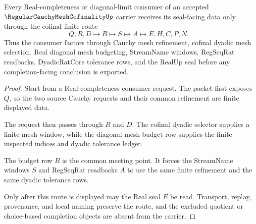 \begin{theorem}
\label{thm:regular-cauchy-mesh-cofinality-real-completeness-handoff}
Every Real-completeness or diagonal-limit consumer of an accepted $\RegularCauchyMeshCofinalityUp$ carrier receives its seal-facing data only through the cofinal finite route
$$
Q,R,D \longmapsto B \longmapsto S \longmapsto A \longmapsto E,H,C,P,N .
$$
Thus the consumer factors through Cauchy mesh refinement, cofinal dyadic mesh selection, Real diagonal mesh budgeting, StreamName windows, RegSeqRat readbacks, DyadicRatCore tolerance rows, and the RealUp seal before any completion-facing conclusion is exported.
\end{theorem}
\begin{proof}
Start from a Real-completeness consumer request. The packet first exposes $Q$, so the two source Cauchy requests and their common refinement are finite displayed data.

The request then passes through $R$ and $D$. The cofinal dyadic selector supplies a finite mesh window, while the diagonal mesh-budget row supplies the finite inspected indices and dyadic tolerance ledger.

The budget row $B$ is the common meeting point. It forces the StreamName windows $S$ and RegSeqRat readbacks $A$ to use the same finite refinement and the same dyadic tolerance rows.

Only after this route is displayed may the Real seal $E$ be read. Transport, replay, provenance, and local naming preserve the route, and the excluded quotient or choice-based completion objects are absent from the carrier.
\end{proof}


